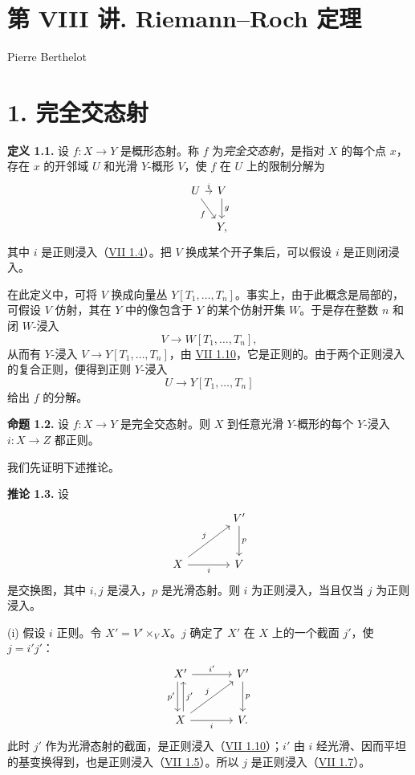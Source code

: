 \section*{第 VIII 讲. Riemann--Roch 定理}
\begin{center}
Pierre Berthelot
\end{center}

\section*{1. 完全交态射}

\textbf{定义 1.1.} 设 $f:X\to Y$ 是概形态射。称 $f$ 为\emph{完全交态射}，是指对 $X$ 的每个点 $x$，存在 $x$ 的开邻域 $U$ 和光滑 $Y$-概形 $V$，使 $f$ 在 $U$ 上的限制分解为
\[
\begin{tikzcd}[column sep=tiny]
U \arrow[r,"i"] \arrow[dr,"f"'] & V \arrow[d,"g"]\\
& Y,
\end{tikzcd}
\]
其中 $i$ 是正则浸入（\hyperlink{sga6.e07.def.1-4}{VII 1.4}）。把 $V$ 换成某个开子集后，可以假设 $i$ 是正则闭浸入。

在此定义中，可将 $V$ 换成向量丛 $Y[T_1,\ldots,T_n]$。事实上，由于此概念是局部的，可假设 $V$ 仿射，其在 $Y$ 中的像包含于 $Y$ 的某个仿射开集 $W$。于是存在整数 $n$ 和闭 $W$-浸入
\[
V\longrightarrow W[T_1,\ldots,T_n],
\]
从而有 $Y$-浸入 $V\to Y[T_1,\ldots,T_n]$，由 \hyperlink{sga6.e07.prop.1-10}{VII 1.10}，它是正则的。由于两个正则浸入的复合正则，便得到正则 $Y$-浸入
\[
U\longrightarrow Y[T_1,\ldots,T_n]
\]
给出 $f$ 的分解。

\textbf{命题 1.2.} 设 $f:X\to Y$ 是完全交态射。则 $X$ 到任意光滑 $Y$-概形的每个 $Y$-浸入 $i:X\to Z$ 都正则。

我们先证明下述推论。

\textbf{推论 1.3.} 设
\[
\begin{tikzcd}[column sep=large,row sep=large]
& V' \arrow[d,"p"]\\
X \arrow[ur,"j"] \arrow[r,"i"'] & V
\end{tikzcd}
\]
是交换图，其中 $i,j$ 是浸入，$p$ 是光滑态射。则 $i$ 为正则浸入，当且仅当 $j$ 为正则浸入。

(i) 假设 $i$ 正则。令 $X'=V'\times_V X$。$j$ 确定了 $X'$ 在 $X$ 上的一个截面 $j'$，使 $j=i'j'$：
\[
\begin{tikzcd}[column sep=large,row sep=large]
X' \arrow[r,"i'"] \arrow[d,shift right=.6ex,"p'"'] & V' \arrow[d,"p"]\\
X \arrow[u,shift right=.6ex,"j'"'] \arrow[r,"i"'] \arrow[ur,"j"] & V .
\end{tikzcd}
\]
此时 $j'$ 作为光滑态射的截面，是正则浸入（\hyperlink{sga6.e07.prop.1-10}{VII 1.10}）；$i'$ 由 $i$ 经光滑、因而平坦的基变换得到，也是正则浸入（\hyperlink{sga6.e07.prop.1-5}{VII 1.5}）。所以 $j$ 是正则浸入（\hyperlink{sga6.e07.prop.1-7}{VII 1.7}）。

